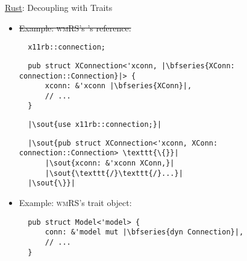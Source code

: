 \begin{frame}[fragile]{\underline{Rust}: Decoupling with Traits \hfill {\footnotesize \currentname}}


    \begin{itemize}
        \itemsep1.4em

        \item \sout<2>{Example: \textsc{wmRS}'s 's  reference:}
\begin{overprint}
\begin{verbatim}
  x11rb::connection;
\end{verbatim}
\begin{verbatim}
  pub struct XConnection<'xconn, |\bfseries{XConn: connection::Connection}|> {
      xconn: &'xconn |\bfseries{XConn}|,
      // ...
  }
\end{verbatim}
\begin{verbatim}
  |\sout{use x11rb::connection;}|
\end{verbatim}
\begin{verbatim}
  |\sout{pub struct XConnection<'xconn, XConn: connection::Connection> \texttt{\{}}|
      |\sout{xconn: &'xconn XConn,}|
      |\sout{\texttt{/}\texttt{/}...}|
  |\sout{\}}|
\end{verbatim}
\end{overprint}

        \item Example: \textsc{wmRS}'s  trait object:\\[3pt]
\begin{verbatim}
  pub struct Model<'model> {
      conn: &'model mut |\bfseries{dyn Connection}|,
      // ...
  }
\end{verbatim}

    \end{itemize}

    \vfill

\end{frame}

